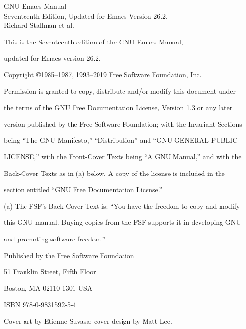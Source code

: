 \newpage
\vspace*{5cm}
\begin{center}
\Huge GNU Emacs Manual\normalall\\\vspace*{4cm}
Seventeenth Edition, Updated for Emacs Version 26.2.\\\vspace*{5cm}
Richard Stallman et al.
\end{center}
\newpage
\vspace*{8cm}
This is the Seventeenth edition of the GNU Emacs Manual,\par
updated for Emacs version 26.2.\par
Copyright \copyright 1985–1987, 1993–2019 Free Software Foundation, Inc.\par
Permission is granted to copy, distribute and/or modify this document under\par
the terms of the GNU Free Documentation License, Version 1.3 or any later\par
version published by the Free Software Foundation; with the Invariant Sections\par
being “The GNU Manifesto,” “Distribution” and “GNU GENERAL PUBLIC\par
LICENSE,” with the Front-Cover Texts being “A GNU Manual,” and with the\par
Back-Cover Texts as in (a) below. A copy of the license is included in the\par
section entitled “GNU Free Documentation License.”\par
(a) The FSF’s Back-Cover Text is: “You have the freedom to copy and modify\par
this GNU manual. Buying copies from the FSF supports it in developing GNU\par
and promoting software freedom.”\par
Published by the Free Software Foundation\par
51 Franklin Street, Fifth Floor\par
Boston, MA 02110-1301 USA\par
ISBN 978-0-9831592-5-4\par
Cover art by Etienne Suvasa; cover design by Matt Lee.\par